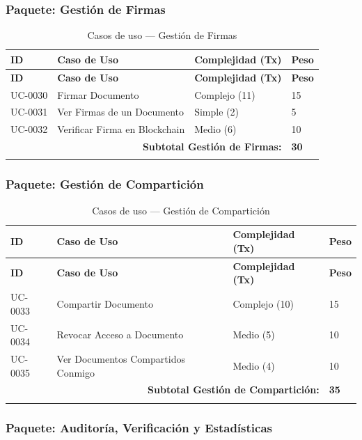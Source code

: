 \documentclass[11pt, a4paper]{article}
\begin{document}
\subsubsection*{Paquete: Gestión de Firmas}

\begin{longtable}{|p{1.8cm}|p{6.5cm}|p{3cm}|p{1.5cm}|}
\hline
\textbf{ID} & \textbf{Caso de Uso} & \textbf{Complejidad (Tx)} & \textbf{Peso} \\
\hline
\endfirsthead
\hline
\textbf{ID} & \textbf{Caso de Uso} & \textbf{Complejidad (Tx)} & \textbf{Peso} \\
\hline
\endhead
UC-0030 & Firmar Documento & Complejo (11) & 15 \\
\hline
UC-0031 & Ver Firmas de un Documento & Simple (2) & 5 \\
\hline
UC-0032 & Verificar Firma en Blockchain & Medio (6) & 10 \\
\hline
\multicolumn{3}{|r|}{\textbf{Subtotal Gestión de Firmas:}} & \textbf{30} \\
\hline
\caption{Casos de uso --- Gestión de Firmas}
\end{longtable}

\subsubsection*{Paquete: Gestión de Compartición}

\begin{longtable}{|p{1.8cm}|p{6.5cm}|p{3cm}|p{1.5cm}|}
\hline
\textbf{ID} & \textbf{Caso de Uso} & \textbf{Complejidad (Tx)} & \textbf{Peso} \\
\hline
\endfirsthead
\hline
\textbf{ID} & \textbf{Caso de Uso} & \textbf{Complejidad (Tx)} & \textbf{Peso} \\
\hline
\endhead
UC-0033 & Compartir Documento & Complejo (10) & 15 \\
\hline
UC-0034 & Revocar Acceso a Documento & Medio (5) & 10 \\
\hline
UC-0035 & Ver Documentos Compartidos Conmigo & Medio (4) & 10 \\
\hline
\multicolumn{3}{|r|}{\textbf{Subtotal Gestión de Compartición:}} & \textbf{35} \\
\hline
\caption{Casos de uso --- Gestión de Compartición}
\end{longtable}

\subsubsection*{Paquete: Auditoría, Verificación y Estadísticas}
\end{document}

